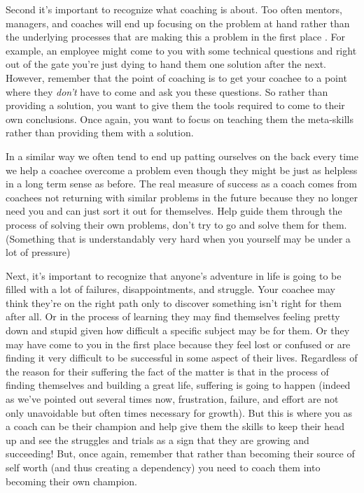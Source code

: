 \documentclass[11pt,a5paper]{book}
\begin{document}
Second it's important to recognize what coaching is about. Too often mentors, managers, and coaches will end up focusing on the problem at hand rather than the underlying processes that are making this a problem in the first place \cite{coactive} \cite{stanier}. For example, an employee might come to you with some technical questions and right out of the gate you're just dying to hand them one solution after the next. However, remember that the point of coaching is to get your coachee to a point where they \textit{don't} have to come and ask you these questions. So rather than providing a solution, you want to give them the tools required to come to their own conclusions. Once again, you want to focus on teaching them the meta-skills rather than providing them with a solution. 
\newline

In a similar way we often tend to end up patting ourselves on the back every time we help a coachee overcome a problem even though they might be just as helpless in a long term sense as before. The real measure of success as a coach comes from coachees not returning with similar problems in the future because they no longer need you and can just sort it out for themselves. Help guide them through the process of solving their own problems, don't try to go and solve them for them. (Something that is understandably very hard when you yourself may be under a lot of pressure)
\newline

Next, it's important to recognize that anyone's adventure in life is going to be filled with a lot of failures, disappointments, and struggle. Your coachee may think they're on the right path only to discover something isn't right for them after all. Or in the process of learning they may find themselves feeling pretty down and stupid given how difficult a specific subject may be for them. Or they may have come to you in the first place because they feel lost or confused or are finding it very difficult to be successful in some aspect of their lives. Regardless of the reason for their suffering the fact of the matter is that in the process of finding themselves and building a great life, suffering is going to happen (indeed as we've pointed out several times now, frustration, failure, and effort are not only unavoidable but often times necessary for growth). But this is where you as a coach can be their champion and help give them the skills to keep their head up and see the struggles and trials as a sign that they are growing and succeeding! But, once again, remember that rather than becoming their source of self worth (and thus creating a dependency) you need to coach them into becoming their own champion. 
\newline
\end{document}
